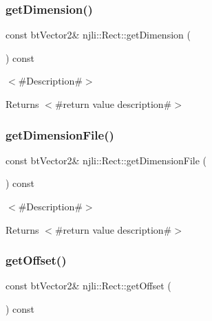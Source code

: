 \mbox{\label{classnjli_1_1_rect_ab814faffd8863d13821d08e5478d98ea}} 
\subsubsection{\texorpdfstring{get\+Dimension()}{getDimension()}}
{\footnotesize\ttfamily const bt\+Vector2\& njli\+::\+Rect\+::get\+Dimension (\begin{DoxyParamCaption}{ }\end{DoxyParamCaption}) const}

$<$\#\+Description\#$>$

\begin{DoxyReturn}{Returns}
$<$\#return value description\#$>$ 
\end{DoxyReturn}
\mbox{\label{classnjli_1_1_rect_a7a3792fecac4ecc852378c5503fecbc6}} 
\subsubsection{\texorpdfstring{get\+Dimension\+File()}{getDimensionFile()}}
{\footnotesize\ttfamily const bt\+Vector2\& njli\+::\+Rect\+::get\+Dimension\+File (\begin{DoxyParamCaption}{ }\end{DoxyParamCaption}) const}

$<$\#\+Description\#$>$

\begin{DoxyReturn}{Returns}
$<$\#return value description\#$>$ 
\end{DoxyReturn}
\mbox{\label{classnjli_1_1_rect_a701e4a44071b449ded9dbcde1412e271}} 
\subsubsection{\texorpdfstring{get\+Offset()}{getOffset()}}
{\footnotesize\ttfamily const bt\+Vector2\& njli\+::\+Rect\+::get\+Offset (\begin{DoxyParamCaption}{ }\end{DoxyParamCaption}) const}

